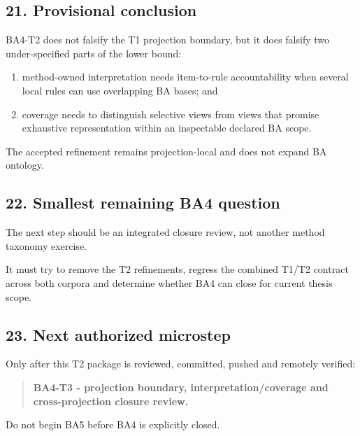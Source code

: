 \documentclass[11pt,a4paper]{article}
\providecommand{\tightlist}{\setlength{\itemsep}{0pt}\setlength{\parskip}{0pt}}
\begin{document}
\subsection{21. Provisional conclusion}\label{21-provisional-conclusion}

BA4-T2 does not falsify the T1 projection boundary, but it does falsify
two under-specified parts of the lower bound:

\begin{enumerate}
\def\labelenumi{\arabic{enumi}.}
\tightlist
\item
  method-owned interpretation needs item-to-rule accountability when
  several local rules can use overlapping BA bases; and
\item
  coverage needs to distinguish selective views from views that promise
  exhaustive representation within an inspectable declared BA scope.
\end{enumerate}

The accepted refinement remains projection-local and does not expand BA
ontology.

\subsection{22. Smallest remaining BA4
question}\label{22-smallest-remaining-ba4-question}

The next step should be an integrated closure review, not another method
taxonomy exercise.

It must try to remove the T2 refinements, regress the combined T1/T2
contract across both corpora and determine whether BA4 can close for
current thesis scope.

\subsection{23. Next authorized
microstep}\label{23-next-authorized-microstep}

Only after this T2 package is reviewed, committed, pushed and remotely
verified:

\begin{quote}
\textbf{BA4-T3 - projection boundary, interpretation/coverage and
cross-projection closure review.}
\end{quote}

Do not begin BA5 before BA4 is explicitly closed.
\end{document}
